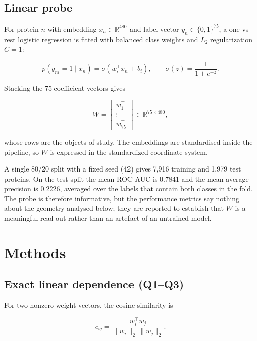 \documentclass[11pt,a4paper]{article}
\begin{document}
\subsection{Linear probe}

For protein $n$ with embedding $x_n \in \mathbb{R}^{480}$ and label vector
$y_n \in \{0,1\}^{75}$, a one-vs-rest logistic regression is fitted with balanced
class weights and $L_2$ regularization $C = 1$:

\begin{equation}
p(y_{ni}=1 \mid x_n) = \sigma(w_i^\top x_n + b_i),
\qquad
\sigma(z) = \frac{1}{1+e^{-z}}.
\end{equation}

Stacking the 75 coefficient vectors gives

\begin{equation}
W =
\begin{bmatrix}
w_1^\top \\ \vdots \\ w_{75}^\top
\end{bmatrix}
\in \mathbb{R}^{75 \times 480},
\end{equation}

whose rows are the objects of study. The embeddings are standardised inside the
pipeline, so $W$ is expressed in the standardized coordinate system.

A single 80/20 split with a fixed seed (42) gives 7{,}916 training and 1{,}979 test
proteins. On the test split the mean ROC-AUC is 0.7841 and the mean average
precision is 0.2226, averaged over the labels that contain both classes in the
fold. The probe is therefore informative, but the performance metrics say nothing
about the geometry analysed below; they are reported to establish that $W$ is a
meaningful read-out rather than an artefact of an untrained model.

\section{Methods}

\subsection{Exact linear dependence (Q1--Q3)}

For two nonzero weight vectors, the cosine similarity is

\begin{equation}
c_{ij} = \frac{w_i^\top w_j}{\lVert w_i \rVert_2 \, \lVert w_j \rVert_2}.
\end{equation}
\end{document}
